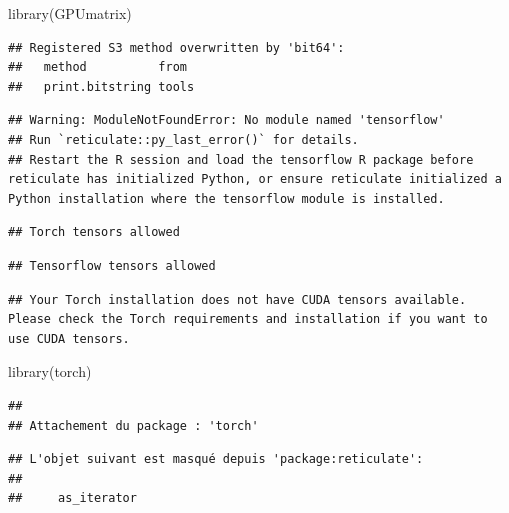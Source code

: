 \documentclass[
  10pt,
]{article}
\newenvironment{Shaded}{\begin{snugshade}}{\end{snugshade}}
\newcommand{\NormalTok}[1]{#1}
\begin{document}
\begin{Shaded}
\begin{Highlighting}[]
\NormalTok{library(GPUmatrix)}
\end{Highlighting}
\end{Shaded}

\begin{verbatim}
## Registered S3 method overwritten by 'bit64':
##   method          from 
##   print.bitstring tools
\end{verbatim}

\begin{verbatim}
## Warning: ModuleNotFoundError: No module named 'tensorflow'
## Run `reticulate::py_last_error()` for details.
## Restart the R session and load the tensorflow R package before reticulate has initialized Python, or ensure reticulate initialized a Python installation where the tensorflow module is installed.
\end{verbatim}

\begin{verbatim}
## Torch tensors allowed
\end{verbatim}

\begin{verbatim}
## Tensorflow tensors allowed
\end{verbatim}

\begin{verbatim}
## Your Torch installation does not have CUDA tensors available. Please check the Torch requirements and installation if you want to use CUDA tensors.
\end{verbatim}

\begin{Shaded}
\begin{Highlighting}[]
\NormalTok{library(torch)}
\end{Highlighting}
\end{Shaded}

\begin{verbatim}
## 
## Attachement du package : 'torch'
\end{verbatim}

\begin{verbatim}
## L'objet suivant est masqué depuis 'package:reticulate':
## 
##     as_iterator
\end{verbatim}
\end{document}

